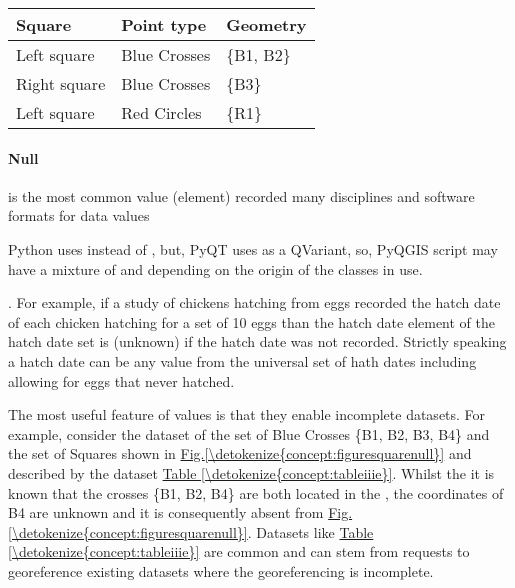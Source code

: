 \documentclass[letterpaper,10pt,english]{sphinxmanual}
\begin{document}
\begin{savenotes}\sphinxattablestart
\centering
{}
\label{\detokenize{concept:id47}}\label{\detokenize{concept:tableiiid}}
\sphinxaftercaption
\begin{tabulary}{\linewidth}[t]{|T|T|T|}
\hline
\sphinxstyletheadfamily 
Square
&\sphinxstyletheadfamily 
Point type
&\sphinxstyletheadfamily 
Geometry
\\
\hline
Left square
&
Blue Crosses
&
\{B1, B2\}
\\
\hline
Right square
&
Blue Crosses
&
\{B3\}
\\
\hline
Left square
&
Red Circles
&
\{R1\}
\\
\hline
\end{tabulary}
\par
\sphinxattableend\end{savenotes}


\paragraph{Null}
\label{\detokenize{concept:null}}
 is the most common value (element) recorded many disciplines and software formats for  data values %
\begin{footnote}[6]\sphinxAtStartFootnote
Python uses  instead of , but, PyQT uses  as a QVariant, so, PyQGIS script may have a mixture of  and  depending on the origin of the classes in use.
%
\end{footnote}.  For example, if a study of chickens hatching from eggs recorded the hatch date of each chicken hatching for a set of 10 eggs than the hatch date element of the hatch date set is  (unknown) if the hatch date was not recorded.  Strictly speaking a  hatch date can be any value from the universal set of hath dates including  allowing for eggs that never hatched.

The most useful feature of  values is that they enable incomplete datasets.  For example, consider the dataset of the set of Blue Crosses \{B1, B2, B3, B4\}  and the set of Squares shown in \hyperref[\detokenize{concept:figuresquarenull}]{Fig.\@ \ref{\detokenize{concept:figuresquarenull}}} and described by the dataset \hyperref[\detokenize{concept:tableiiie}]{Table \ref{\detokenize{concept:tableiiie}}}.  Whilst the it is known that the crosses \{B1, B2, B4\} are both located in the , the coordinates of B4 are unknown and it is consequently absent from  \hyperref[\detokenize{concept:figuresquarenull}]{Fig.\@ \ref{\detokenize{concept:figuresquarenull}}}.  Datasets like \hyperref[\detokenize{concept:tableiiie}]{Table \ref{\detokenize{concept:tableiiie}}} are common and can stem from requests to georeference existing datasets where the georeferencing is incomplete.
\end{document}
